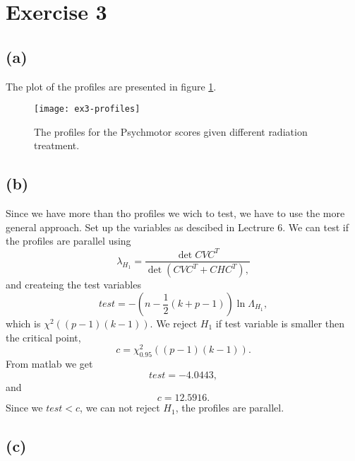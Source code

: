 
\section*{Exercise 3}
\label{sec:exercise-3}

\subsection*{(a)}
\label{sec:a-2}
The plot of the profiles are presented in figure
\ref{fig:ex3-profiles}.
\begin{figure}[h]
  \centering
  \texttt{[image: ex3-profiles]}
  \caption{The profiles for the Psychmotor scores given different
    radiation treatment.}
  \label{fig:ex3-profiles}
\end{figure}

\subsection*{(b)}
\label{sec:b-2}


Since we have more than tho profiles we wich to test, we have to use
the more general approach. Set up the variables as descibed in Lectrure
6. We can test if the profiles are parallel using
\begin{equation*}
  \lambda_{H_1} = \frac{\det CVC^T}{\det( CVC^T  + CHC^T),}
\end{equation*}
and createing the test variables
\begin{equation*}
  test = -\left(n - \frac 12(k + p -1)\right) \ln \Lambda_{H_1},
\end{equation*}
which is $\chi^2((p-1)(k-1))$. We reject $H_1$ if test variable is
smaller then the critical point, 
\begin{equation*}
  c = \chi^2 _{0.95} ((p-1)(k-1)).
\end{equation*}
From matlab we get
\begin{equation*}
  test = -4.0443,
\end{equation*}
and
\begin{equation*}
    c = 12.5916.
\end{equation*}
Since we $test < c$, we can not reject $H_1$, the profiles are parallel.


\subsection*{(c)}
\label{sec:c-2}

